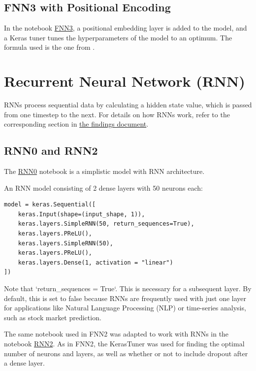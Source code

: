 \documentclass{article}
\begin{document}
\subsection{FNN3 with Positional Encoding}

In the notebook \href{https://github.com/AntonStantan/matura/blob/main/FNN/FNN3.ipynb}{FNN3}, a positional embedding layer is added to the model, and a Keras tuner tunes the hyperparameters of the model to an optimum. The formula used is the one from \cite{vaswani2023attentionneed}.


\section{Recurrent Neural Network (RNN)}

RNNs process sequential data by calculating a hidden state value, which is passed from one timestep to the next. For details on how RNNs work, refer to the corresponding section in \href{https://github.com/AntonStantan/matura/blob/main/documentation/findings/findings.pdf}{the findings document}.

\subsection{RNN0 and RNN2}
The \href{https://github.com/AntonStantan/matura/blob/main/RNN/RNN0.ipynb}{RNN0} notebook is a simplistic model with RNN architecture.

An RNN model consisting of 2 dense layers with 50 neurons each:

\begin{Verbatim}
model = keras.Sequential([
    keras.Input(shape=(input_shape, 1)),
    keras.layers.SimpleRNN(50, return_sequences=True),
    keras.layers.PReLU(),
    keras.layers.SimpleRNN(50),
    keras.layers.PReLU(),
    keras.layers.Dense(1, activation = "linear")
])
\end{Verbatim}
Note that `return\_sequences = True`. This is necessary for a subsequent layer. By default, this is set to false because RNNs are frequently used with just one layer for applications like Natural Language Processing (NLP) or time-series analysis, such as stock market prediction.

The same notebook used in FNN2 was adapted to work with RNNs in the notebook \href{https://github.com/AntonStantan/matura/blob/main/RNN/RNN2.ipynb}{RNN2}. As in FNN2, the KerasTuner was used for finding the optimal number of neurons and layers, as well as whether or not to include dropout after a dense layer.
\end{document}
